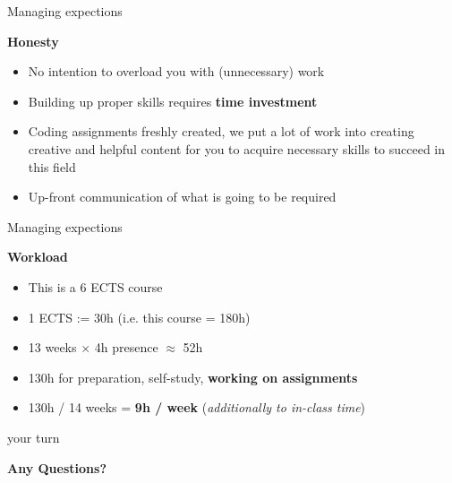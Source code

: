 \documentclass[11pt,compress,t,notes=noshow, xcolor=table]{beamer}
\begin{document}
\begin{frame}{Managing expections}

\vfill

\textbf{Honesty}

	\begin{itemize}
		\item No intention to overload you with (unnecessary) work
		\item Building up proper skills requires \textbf{time investment}
		\item Coding assignments freshly created, we put a lot of work into creating creative and helpful content for you to acquire necessary skills to succeed in this field
		\item Up-front communication of what is going to be required
	\end{itemize}
\vfill

\end{frame}


\begin{frame}{Managing expections}

\vfill

\textbf{Workload}

	\begin{itemize}
		\item This is a 6 ECTS course
		\item 1 ECTS := 30h (i.e. this course = 180h)
		\item 13 weeks $\times$ 4h presence $\approx$ 52h
		\item 130h for preparation, self-study, \textbf{working on assignments} 
		\item 130h / 14 weeks = \textbf{9h / week} (\textit{additionally to in-class time})
	\end{itemize}


\vfill

\end{frame}


\begin{frame}{your turn}

\vfill

\centering \Huge{\bf Any Questions?}

\vfill

\end{frame}


\endlecture
\end{document}

